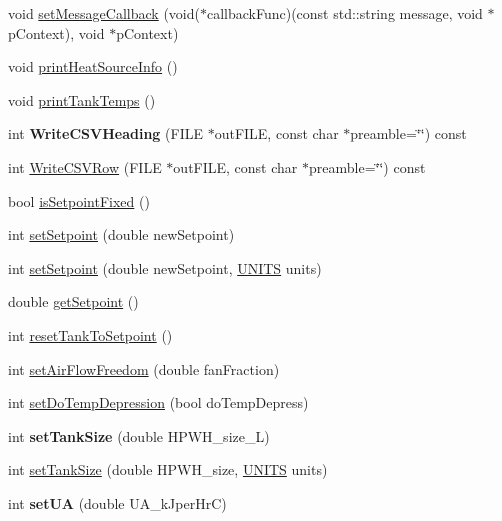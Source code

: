 \begin{DoxyCompactItemize}
\item 
void \hyperlink{class_h_p_w_h_af20440c49f36a44b66b82d16b0b6a74b}{set\-Message\-Callback} (void($\ast$callback\-Func)(const std\-::string message, void $\ast$p\-Context), void $\ast$p\-Context)
\item 
void \hyperlink{class_h_p_w_h_a49d923bea7be1ad1ee60c02163bbf6cc}{print\-Heat\-Source\-Info} ()
\item 
void \hyperlink{class_h_p_w_h_a59d5b765bf4490be7bd5954a5ab7324e}{print\-Tank\-Temps} ()
\item 
\hypertarget{class_h_p_w_h_ac8bced7dc05598df491f907cd895ccaa}{int {\bfseries Write\-C\-S\-V\-Heading} (F\-I\-L\-E $\ast$out\-F\-I\-L\-E, const char $\ast$preamble=\char`\"{}\char`\"{}) const }\label{class_h_p_w_h_ac8bced7dc05598df491f907cd895ccaa}

\item 
int \hyperlink{class_h_p_w_h_a5652291d663296decd912fe92fb9d4e7}{Write\-C\-S\-V\-Row} (F\-I\-L\-E $\ast$out\-F\-I\-L\-E, const char $\ast$preamble=\char`\"{}\char`\"{}) const 
\item 
bool \hyperlink{class_h_p_w_h_adeb9b796845880f192dbaf44ad1b9ffb}{is\-Setpoint\-Fixed} ()
\item 
int \hyperlink{class_h_p_w_h_adb49b5846f9056602de57cb289e0a321}{set\-Setpoint} (double new\-Setpoint)
\item 
int \hyperlink{class_h_p_w_h_ab7d91fead271ef907cf13450055cdb06}{set\-Setpoint} (double new\-Setpoint, \hyperlink{class_h_p_w_h_a145320dbf116b9245ac4421026cff294}{U\-N\-I\-T\-S} units)
\item 
double \hyperlink{class_h_p_w_h_abb569bea8e36482acd73be63c4eabd77}{get\-Setpoint} ()
\item 
int \hyperlink{class_h_p_w_h_aac5af7347053c06dcbc446b44fa3686d}{reset\-Tank\-To\-Setpoint} ()
\item 
int \hyperlink{class_h_p_w_h_ae9c7561968c17d6b0bb28d17cc7b700f}{set\-Air\-Flow\-Freedom} (double fan\-Fraction)
\item 
int \hyperlink{class_h_p_w_h_a4fcbecc80f393cabf73609ef97c3e56b}{set\-Do\-Temp\-Depression} (bool do\-Temp\-Depress)
\item 
\hypertarget{class_h_p_w_h_acc2635e0073fee9bdf050eaec8e73d9c}{int {\bfseries set\-Tank\-Size} (double H\-P\-W\-H\-\_\-size\-\_\-\-L)}\label{class_h_p_w_h_acc2635e0073fee9bdf050eaec8e73d9c}

\item 
int \hyperlink{class_h_p_w_h_a48eb98ee5cef78dc29fbeaba57c37b2d}{set\-Tank\-Size} (double H\-P\-W\-H\-\_\-size, \hyperlink{class_h_p_w_h_a145320dbf116b9245ac4421026cff294}{U\-N\-I\-T\-S} units)
\item 
\hypertarget{class_h_p_w_h_a1c26c0b3879d5378cb3ec372adabb9a3}{int {\bfseries set\-U\-A} (double U\-A\-\_\-k\-Jper\-Hr\-C)}\label{class_h_p_w_h_a1c26c0b3879d5378cb3ec372adabb9a3}


\end{DoxyCompactItemize}
